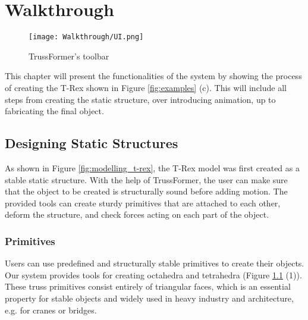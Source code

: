 \chapter{Walkthrough}\label{ch:walkthrough}
\begin{figure}[ht!]
    \texttt{[image: Walkthrough/UI.png]}
    \centering
    \caption{TrussFormer's toolbar}
    \label{fig:toolbar}
\end{figure}
This chapter will present the functionalities of the system by showing the process of creating the T-Rex shown in Figure \ref{fig:examples} (c). This will include all steps from creating the static structure, over introducing animation, up to fabricating the final object.

\section{Designing Static Structures}
As shown in Figure \ref{fig:modelling_t-rex}, the T-Rex model was first created as a stable static structure. With the help of TrussFormer, the user can make sure that the object to be created is structurally sound before adding motion. The provided tools can create sturdy primitives that are attached to each other, deform the structure, and check forces acting on each part of the object.

\subsection{Primitives}
Users can use predefined and structurally stable primitives to create their objects. Our system provides tools for creating octahedra and tetrahedra (Figure \ref{fig:toolbar} (1)). These truss primitives consist entirely of triangular faces, which is an essential property for stable objects and widely used in heavy industry and architecture, e.g. for cranes or bridges.

